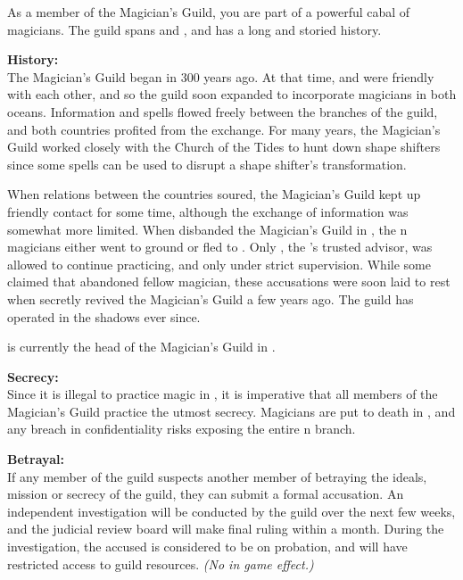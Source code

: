 \documentclass[blue]{NeptuneBall}
\begin{document}
\name{\bMagician{}}

As a member of the Magician's Guild, you are part of a powerful cabal of magicians. The guild spans \pAtlantis{} and \pPacifica{}, and has a long and storied history.

{\bf History:}\\
The Magician's Guild began in \pAtlantis{} 300 years ago. At that time, \pAtlantis{} and \pPacifica{} were friendly with each other, and so the guild soon expanded to incorporate magicians in both oceans. Information and spells flowed freely between the branches of the guild, and both countries profited from the exchange. For many years, the Magician's Guild worked closely with the Church of the Tides to hunt down shape shifters since some spells can be used to disrupt a shape shifter's transformation.

When relations between the countries soured, the Magician's Guild kept up friendly contact for some time, although the exchange of information was somewhat more limited. When \cKing{\King} \cKing{} disbanded the Magician's Guild in \pAtlantis{}, the \pAtlantis{}n magicians either went to ground or fled to \pPacifica{}. Only \cManta{}, the \cKing{\King}'s trusted advisor, was allowed to continue practicing, and only under strict supervision. While some claimed that \cManta{} abandoned \cManta{\their} fellow magician, these accusations were soon laid to rest when \cManta{} secretly revived the Magician's Guild a few years ago. The guild has operated in the shadows ever since.

\cManta{} is currently the head of the Magician's Guild in \pAtlantis{}.

{\bf Secrecy:}\\
Since it is illegal to practice magic in \pAtlantis{}, it is imperative that all members of the Magician's Guild practice the utmost secrecy. Magicians are put to death in \pAtlantis{}, and any breach in confidentiality risks exposing the entire \pAtlantis{}n branch.

{\bf Betrayal:}\\
If any member of the guild suspects another member of betraying the ideals, mission or secrecy of the guild, they can submit a formal accusation. An independent investigation will be conducted by the guild over the next few weeks, and the judicial review board will make final ruling within a month. During the investigation, the accused is considered to be on probation, and will have restricted access to guild resources. \emph{(No in game effect.)}
\end{document}
